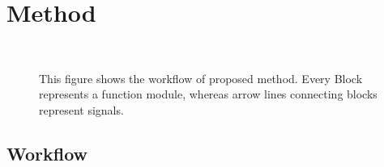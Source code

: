 \documentclass[letterpaper, 10 pt, conference]{ieeeconf}
\begin{document}
\section{Method} \label{sec:method}

\begin{figure}[thpb!]
\vspace{-0.cm}
\small
\centering
     \\    
  \caption{This figure shows the workflow of proposed method. Every Block represents a function module, 
whereas arrow lines connecting blocks represent signals.}
  \label{fig:workflow}
  \scriptsize{}
\end{figure}

\subsection{Workflow}
\end{document}
